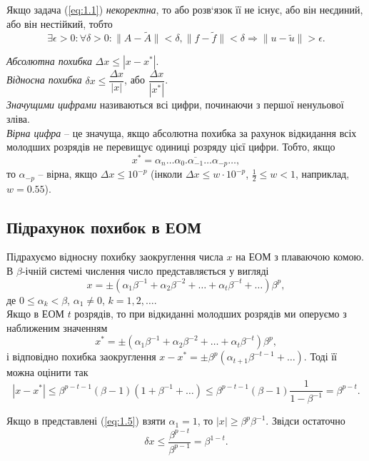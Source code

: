 Якщо задача (\ref{eq:1.1}) \textit{некоректна}, то або розв‘язок її не існує, або він неєдиний, або він нестійкий, тобто \[ \exists \epsilon > 0: \forall \delta > 0: \| A - \tilde A\|<\delta, \|f-\tilde f\| < \delta \Rightarrow \|u-\tilde u\| > \epsilon.\]

\textit{Абсолютна похибка} $\Delta x \le | x - x^*|$. \\

\textit{Відносна похибка} $\delta x \le \dfrac{\Delta x}{|x|}$, або $\dfrac{\Delta x}{|x^*|}$. \\

\textit{Значущими цифрами} називаються всі цифри, починаючи з першої ненульової зліва. \\

\textit{Вірна цифра} -- це значуща, якщо абсолютна похибка за рахунок відкидання всіх молодших розрядів не перевищує одиниці розряду цієї цифри. Тобто, якщо \[x^* = \overline{\alpha_n \ldots \alpha_0.\alpha_{-1}\ldots\alpha_{-p}\ldots},\] то $\alpha_{-p}$ -- вірна, якщо $\Delta x \le 10^{-p}$ (інколи $\Delta x \le w \cdot 10^{-p}$, $\frac12 \le w < 1$, наприклад, $w = 0.55$).

\subsection{Підрахунок похибок в ЕОМ}

Підрахуємо відносну похибку заокруглення числа $x$ на ЕОМ з плаваючою комою. В $\beta$-ічній системі числення число представляється у вигляді
\begin{equation}
	\label{eq:1.5}
	x = \pm (\alpha_1 \beta^{-1} + \alpha_2 \beta^{-2} + \ldots + \alpha_t \beta^{-t} + \ldots) \beta^p,
\end{equation}
де $0 \le \alpha_k < \beta$, $\alpha_1 \ne 0$, $k = 1,2,\ldots$. \\

Якщо в ЕОМ $t$ розрядів, то при відкиданні молодших розрядів ми оперуємо з наближеним значенням \[x^* = \pm (\alpha_1 \beta^{-1} + \alpha_2 \beta^{-2} + \ldots + \alpha_t \beta^{-t}) \beta^p,\] 
і відповідно похибка заокруглення $x - x^* = \pm \beta^p (\alpha_{t+1} \beta^{-t-1} + \ldots)$. Тоді її можна оцінити так \[ |x - x^*| \le \beta^{p-t-1}(\beta-1)(1 + \beta^{-1}+\ldots)\le \beta^{p-t-1}(\beta-1)\dfrac{1}{1-\beta^{-1}}=\beta^{p-t}.\]

Якщо в представлені (\ref{eq:1.5}) взяти $\alpha_1 = 1$, то $|x| \ge \beta^p \beta^{-1}$. Звідси остаточно \[\delta x \le \dfrac{\beta^{p-t}}{\beta^{p-1}}=\beta^{1-t}.\]

